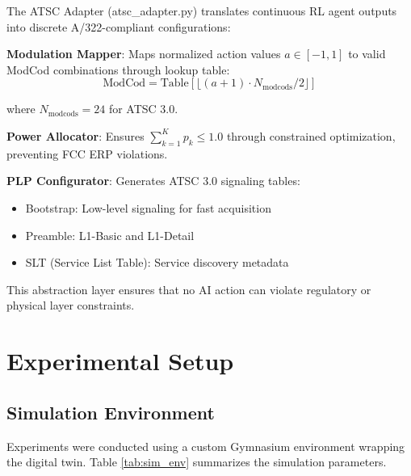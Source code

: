 \documentclass[conference]{IEEEtran}
\begin{document}
The ATSC Adapter (atsc\_adapter.py) translates continuous RL agent outputs into discrete A/322-compliant configurations:

\textbf{Modulation Mapper}: Maps normalized action values $a \in [-1, 1]$ to valid ModCod combinations through lookup table:
\begin{equation}
\text{ModCod} = \text{Table}[\lfloor (a + 1) \cdot N_{\text{modcods}} / 2 \rfloor]
\end{equation}

where $N_{\text{modcods}} = 24$ for ATSC 3.0.

\textbf{Power Allocator}: Ensures $\sum_{k=1}^{K} p_k \leq 1.0$ through constrained optimization, preventing FCC ERP violations.

\textbf{PLP Configurator}: Generates ATSC 3.0 signaling tables:
\begin{itemize}
\item Bootstrap: Low-level signaling for fast acquisition
\item Preamble: L1-Basic and L1-Detail
\item SLT (Service List Table): Service discovery metadata
\end{itemize}

This abstraction layer ensures that no AI action can violate regulatory or physical layer constraints.



\section{Experimental Setup}

\subsection{Simulation Environment}

Experiments were conducted using a custom Gymnasium environment wrapping the digital twin. Table \ref{tab:sim_env} summarizes the simulation parameters.
\end{document}
